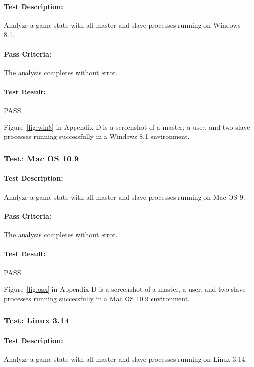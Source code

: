 \documentclass[pdftex,12pt,a4paper]{article}
\begin{document}
\paragraph{Test Description:} Analyze a game state with all master and slave processes running on Windows 8.1.

\paragraph{Pass Criteria:} The analysis completes without error.

\paragraph{Test Result:} PASS

Figure~\ref{fig:win8} in Appendix D is a screenshot of a master, a user, and two slave processes running successfully in a Windows 8.1 environment.

\subsubsection{\textbf{Test:} Mac OS 10.9}

\paragraph{Test Description:} Analyze a game state with all master and slave processes running on Mac OS 9.

\paragraph{Pass Criteria:} The analysis completes without error.

\paragraph{Test Result:} PASS

Figure~\ref{fig:osx} in Appendix D is a screenshot of a master, a user, and two slave processes running successfully in a Mac OS 10.9 environment.

\subsubsection{\textbf{Test:} Linux 3.14}

\paragraph{Test Description:} Analyze a game state with all master and slave processes running on Linux 3.14.
\end{document}
